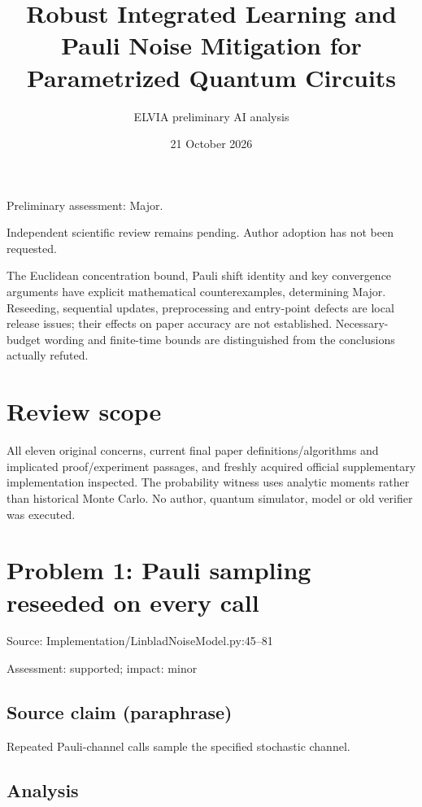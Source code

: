 \documentclass[11pt]{article}
\begin{document}
\title{Robust Integrated Learning and Pauli Noise Mitigation for Parametrized Quantum Circuits}

\author{ELVIA preliminary AI analysis}\date{21 October 2026}\maketitle

Preliminary assessment: Major.\par

Independent scientific review remains pending. Author adoption has not been requested.

The Euclidean concentration bound, Pauli shift identity and key convergence arguments have explicit mathematical counterexamples, determining Major. Reseeding, sequential updates, preprocessing and entry-point defects are local release issues; their effects on paper accuracy are not established. Necessary-budget wording and finite-time bounds are distinguished from the conclusions actually refuted.

\section*{Review scope}

All eleven original concerns, current final paper definitions/algorithms and implicated proof/experiment passages, and freshly acquired official supplementary implementation inspected. The probability witness uses analytic moments rather than historical Monte Carlo. No author, quantum simulator, model or old verifier was executed.

\section*{Problem 1: Pauli sampling reseeded on every call}

Source: Implementation/LinbladNoiseModel.py:45–81

Assessment: supported; impact: minor

\subsection*{Source claim (paraphrase)}

Repeated Pauli-channel calls sample the specified stochastic channel.

\subsection*{Analysis}
\end{document}
